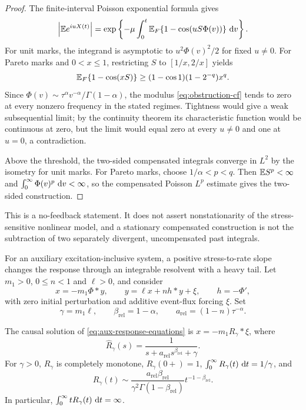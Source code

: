 \begin{proof}
The finite-interval Poisson exponential formula gives
\begin{equation}\label{eq:obstruction-cf}
\left|\mathbb{E}  e^{iuX(t)}\right|
=\exp\left\{-\mu\int_0^t
\mathbb{E} _F\{1-\cos(uS\Phi(v))\}\,\mathop{}\!\mathrm{d} v\right\}.
\end{equation}
For unit marks, the integrand is asymptotic to \(u^2\Phi(v)^2/2\) for fixed \(u\neq0\). For Pareto marks and \(0<x\leq1\), restricting \(S\) to \([1/x,2/x]\) yields
\[
\mathbb{E} _F\{1-\cos(xS)\}
\geq(1-\cos1)(1-2^{-q})x^q.
\]
Since
\(\Phi(v)\sim\tau^\alpha v^{-\alpha}/\Gamma(1-\alpha)\),
the modulus \eqref{eq:obstruction-cf} tends to zero at every nonzero frequency in the stated regimes. Tightness would give a weak subsequential limit; by the continuity theorem its characteristic function would be continuous at zero, but the limit would equal zero at every \(u\neq0\) and one at \(u=0\), a contradiction.

Above the threshold, the two-sided compensated integrals converge in \(L^2\) by the isometry for unit marks. For Pareto marks, choose \(1/\alpha<p<q\). Then \(\mathbb{E}  S^p<\infty\) and \(\int_0^\infty\Phi(v)^p\,\mathop{}\!\mathrm{d} v<\infty\), so the compensated Poisson \(L^p\) estimate gives the two-sided construction.
\end{proof}

This is a no-feedback statement. It does not assert nonstationarity of the stress-sensitive nonlinear model, and a stationary compensated construction is not the subtraction of two separately divergent, uncompensated past integrals.

For an auxiliary excitation-inclusive system, a positive stress-to-rate slope changes the response through an integrable resolvent with a heavy tail. Let \(m_1>0\), \(0\leq n<1\) and \(\ell>0\), and consider
\begin{equation}\label{eq:aux-response-equations}
x=-m_1\Phi*y,\qquad
y=\ell x+nh*y+\xi,\qquad
h=-\Phi',
\end{equation}
with zero initial perturbation and additive event-flux forcing \(\xi\). Set
\[
\gamma=m_1\ell,\qquad \beta_{\mathrm{rel}}=1-\alpha,\qquad
a_{\mathrm{rel}}=(1-n)\tau^{-\alpha}.
\]

\begin{proposition}\label{prop:auxiliary-response}
The causal solution of \eqref{eq:aux-response-equations} is
\(x=-m_1R_\gamma*\xi\), where
\begin{equation}\label{eq:response-transform}
\widehat R_\gamma(s)=\frac{1}{s+a_{\mathrm{rel}} s^{\beta_{\mathrm{rel}}}+\gamma}.
\end{equation}
For \(\gamma>0\), \(R_\gamma\) is completely monotone, \(R_\gamma(0+)=1\), \(\int_0^\infty R_\gamma(t)\,\mathop{}\!\mathrm{d} t=1/\gamma\), and
\begin{equation}\label{eq:response-tail}
R_\gamma(t)\sim
\frac{a_{\mathrm{rel}}\beta_{\mathrm{rel}}}{\gamma^2\Gamma(1-\beta_{\mathrm{rel}})}t^{-1-\beta_{\mathrm{rel}}}.
\end{equation}
In particular, \(\int_0^\infty tR_\gamma(t)\,\mathop{}\!\mathrm{d} t=\infty\).
\end{proposition}

